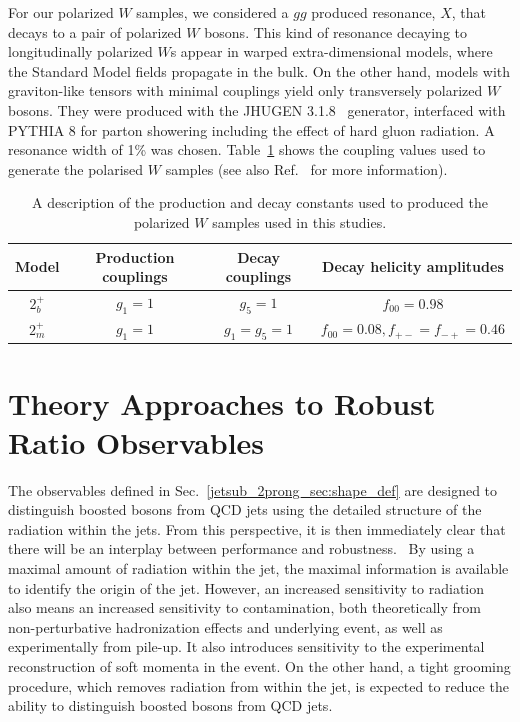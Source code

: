 \documentclass[11pt,letterpaper]{article}
\begin{document}
For our polarized $W$ samples, we considered a $gg$ produced resonance, $X$, that decays to a pair of polarized $W$ bosons.
%
This kind of resonance decaying to longitudinally polarized $W$s appear in warped extra-dimensional models, where the Standard Model fields propagate in the bulk.
%
On the other hand, models with graviton-like tensors with minimal couplings yield only transversely polarized $W$ bosons.
%
They were produced with the \textsc{JHUGEN} 3.1.8~\cite{Gao:2010qx,Bolognesi:2012mm} generator, interfaced with \textsc{PYTHIA} 8 \cite{Sjostrand:2007gs} for parton showering including the effect of hard gluon radiation.
%
%
A resonance width of 1\% was chosen.
%
Table~\ref{jetsub_2prong_table:polarisedSamples} shows the coupling values used to generate the polarised $W$ samples (see also Ref.~\cite{Gao:2010qx} for more information). 

\begin{table}[t]
\centering
\begin{tabular}{|c|c|c|c|}
\hline
Model	&Production couplings	&Decay couplings	&Decay helicity amplitudes 	\\
\hline
$2_b^+$	& $g_1=1$		& $g_5=1$		& $f_{00}=0.98$			\\
$2_m^+$	& $g_1=1$		& $g_1=g_5=1$		& $f_{00}=0.08,f_{+-}=f_{-+}=0.46$\\	
\hline
\end{tabular}
\caption{A description of the production and decay constants used to produced the polarized $W$ samples used in this studies.}
\label{jetsub_2prong_table:polarisedSamples}
\end{table}



\section{Theory Approaches to Robust Ratio Observables}\label{jetsub_2prong_sec:hybrid_ratio}

The observables defined in Sec.~\ref{jetsub_2prong_sec:shape_def} are designed to
distinguish boosted bosons from QCD jets using the detailed structure
of the radiation within the jets.
%
From this perspective, it is then
immediately clear that there will be an interplay between performance
and robustness.\
%
By using a maximal amount of radiation within the jet,
the maximal information is available to identify the origin of the
jet.
%
However, an increased sensitivity to radiation also means an
increased sensitivity to contamination, both theoretically from
non-perturbative hadronization effects and underlying event, as well
as experimentally from pile-up.
%
It also introduces sensitivity to the
experimental reconstruction of soft momenta in the event.
%
On the other
hand, a tight grooming procedure, which removes radiation from within
the jet, is expected to reduce the ability to distinguish boosted
bosons from QCD jets.
\end{document}
